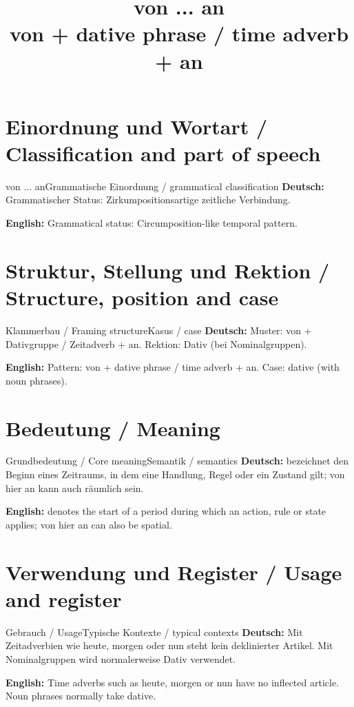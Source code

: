 \documentclass[a4paper,11pt]{article}
\title{von ... an\\ \large von + dative phrase / time adverb + an}
\date{}
\newcommand{\GermanText}[1]{\textbf{Deutsch: }#1\par}
\newcommand{\EnglishText}[1]{{\small\color{SoftGray}\textbf{English: }#1\par}}
\begin{document}
\maketitle
\tableofcontents
\newpage
\section{Einordnung und Wortart / Classification and part of speech}
\begin{grammarentry}{von ... an}{Grammatische Einordnung / grammatical classification}
\GermanText{Grammatischer Status: Zirkumpositionsartige zeitliche Verbindung.}
\EnglishText{Grammatical status: Circumposition-like temporal pattern.}
\end{grammarentry}
\section{Struktur, Stellung und Rektion / Structure, position and case}
\begin{grammarentry}{Klammerbau / Framing structure}{Kasus / case}
\GermanText{Muster: von + Dativgruppe / Zeitadverb + an. Rektion: Dativ (bei Nominalgruppen).}
\EnglishText{Pattern: von + dative phrase / time adverb + an. Case: dative (with noun phrases).}
\end{grammarentry}
\section{Bedeutung / Meaning}
\begin{grammarentry}{Grundbedeutung / Core meaning}{Semantik / semantics}
\GermanText{bezeichnet den Beginn eines Zeitraums, in dem eine Handlung, Regel oder ein Zustand gilt; von hier an kann auch räumlich sein.}
\EnglishText{denotes the start of a period during which an action, rule or state applies; von hier an can also be spatial.}
\end{grammarentry}
\section{Verwendung und Register / Usage and register}
\begin{grammarentry}{Gebrauch / Usage}{Typische Kontexte / typical contexts}
\GermanText{Mit Zeitadverbien wie heute, morgen oder nun steht kein deklinierter Artikel. Mit Nominalgruppen wird normalerweise Dativ verwendet.}
\EnglishText{Time adverbs such as heute, morgen or nun have no inflected article. Noun phrases normally take dative.}
\end{grammarentry}
\end{document}
